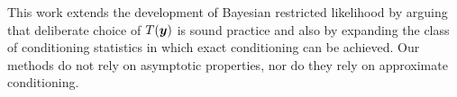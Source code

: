 \documentclass[12pt]{article}
\def\bth{\mbox{\boldmath $\theta$}}
\newcommand{\by}{\mbox{\boldmath $y$}}
\newcommand{\green}[1]{{\color{green}#1}}
\begin{document}


This work extends the development of Bayesian restricted likelihood by arguing that deliberate choice of $T(\by)$ is sound practice and also by expanding the class of conditioning statistics in which exact conditioning can be achieved.  Our methods do not rely on asymptotic properties, nor do they rely on approximate conditioning.%

\end{document}
